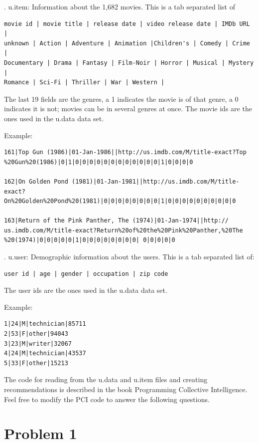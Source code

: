 \documentclass[12pt]{article}
\begin{document}
.  u.item: Information about the 1,682 movies. This is a tab
separated list of

\begin{verbatim}
movie id | movie title | release date | video release date | IMDb URL | 
unknown | Action | Adventure | Animation |Children's | Comedy | Crime | 
Documentary | Drama | Fantasy | Film-Noir | Horror | Musical | Mystery | 
Romance | Sci-Fi | Thriller | War | Western |
\end{verbatim}

The last 19 fields are the genres, a 1 indicates the movie is of
that genre, a 0 indicates it is not; movies can be in several genres
at once. The movie ids are the ones used in the u.data data set.
\newpage

\noindent
Example:

\begin{verbatim}
161|Top Gun (1986)|01-Jan-1986||http://us.imdb.com/M/title-exact?Top
%20Gun%20(1986)|0|1|0|0|0|0|0|0|0|0|0|0|0|0|1|0|0|0|0 

162|On Golden Pond (1981)|01-Jan-1981||http://us.imdb.com/M/title-
exact?On%20Golden%20Pond%20(1981)|0|0|0|0|0|0|0|0|1|0|0|0|0|0|0|0|0|0|0 

163|Return of the Pink Panther, The (1974)|01-Jan-1974||http://
us.imdb.com/M/title-exact?Return%20of%20the%20Pink%20Panther,%20The
%20(1974)|0|0|0|0|0|1|0|0|0|0|0|0|0|0| 0|0|0|0|0
\end{verbatim}

.  u.user: Demographic information about the users. This is a tab
separated list of:

\begin{verbatim}
user id | age | gender | occupation | zip code
\end{verbatim}

\noindent
The user ids are the ones used in the u.data data set.

\noindent
Example:

\begin{verbatim}
1|24|M|technician|85711 
2|53|F|other|94043 
3|23|M|writer|32067 
4|24|M|technician|43537 
5|33|F|other|15213
\end{verbatim}

The code for reading from the u.data and u.item files and creating
recommendations is described in the book Programming Collective
Intelligence.  Feel free to modify the PCI code to answer the 
following questions.

\section*{Problem 1}
\end{document}
